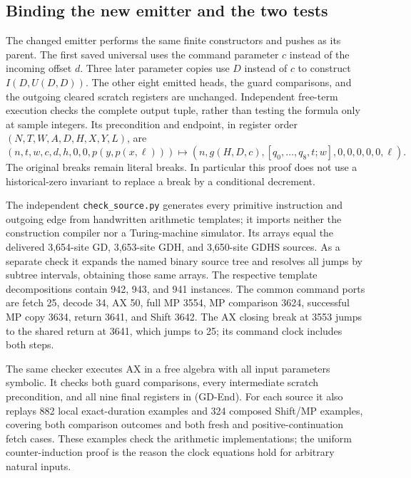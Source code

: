 \subsection{Binding the new emitter and the two tests}

The changed emitter performs the same finite constructors and pushes as
its parent.  The first saved universal uses the command parameter $c$
instead of the incoming offset $d$.  Three later parameter copies use
$D$ instead of $c$ to construct $I(D,U(D,D))$.  The other eight emitted
heads, the guard comparisons, and the outgoing cleared scratch registers
are unchanged.  Independent free-term execution checks the complete
output tuple, rather than testing the formula only at sample integers.
Its precondition and endpoint, in register order $(N,T,W,A,D,H,X,Y,L)$,
are
\[
 (n,t,w,c,d,h,0,0,p(y,p(x,\ell)))
 \longmapsto
 (n,g(H,D,c),[q_0,\ldots,q_8,t;w],0,0,0,0,0,\ell).
                                                        \tag{GD-End}\label{eq:gd-end}
\]
The original breaks remain literal breaks.  In particular this proof
does not use a historical-zero invariant to replace a break by a
conditional decrement.

The independent \texttt{check\_source.py} generates every primitive
instruction and outgoing edge from handwritten arithmetic templates;
it imports neither the construction compiler nor a Turing-machine
simulator.  Its arrays equal the delivered 3,654-site GD, 3,653-site
GDH, and 3,650-site GDHS sources.  As a separate check it expands the
named binary source tree and resolves all jumps by subtree intervals,
obtaining those same arrays.  The respective template decompositions
contain 942, 943, and 941 instances.  The common command ports are
fetch 25, decode 34, AX 50, full MP 3554, MP comparison 3624,
successful MP copy 3634, return 3641, and Shift 3642.
The AX closing break at 3553 jumps to the shared return at 3641,
which jumps to 25; its command clock includes both steps.

The same checker executes AX in a free algebra with all input
parameters symbolic.  It checks both guard comparisons, every
intermediate scratch precondition, and all nine final registers in
(GD-End).  For each source it also replays 882 local exact-duration
examples and 324 composed Shift/MP examples, covering both comparison
outcomes and both fresh and positive-continuation fetch cases.
These examples check the arithmetic implementations; the uniform
counter-induction proof is the reason the clock equations hold for
arbitrary natural inputs.


